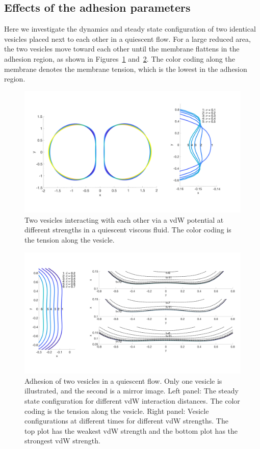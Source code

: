 \documentclass[%
preprint,
 amsmath,amssymb,
 aps,
]{revtex4-1}
\begin{document}
\subsection{Effects of the adhesion parameters}
\label{subsec:qflow_adhesion_parameters} 
Here we investigate the dynamics and steady state configuration of two
identical vesicles placed next to each other in a quiescent flow.  For a
large reduced area, the two vesicles move toward each other until the
membrane flattens in the adhesion region, as shown in
Figures~\ref{fig:qflow01} and~\ref{fig:qflow02}.  The color coding along
the membrane denotes the membrane tension, which is the lowest in the
adhesion region.

\begin{figure}
\includegraphics[keepaspectratio=true,scale=0.125]{figs/Nrelax2Ves02-rA0p96adR0p4.png}
\caption{Two vesicles interacting with each other via a vdW potential at different strengths in a quiescent viscous fluid. The color coding is the tension along the vesicle.}
\label{fig:qflow01}
\end{figure}

\begin{figure}
\includegraphics[keepaspectratio=true,scale=0.25]{figs/Nrelax2Ves02composite-draining.pdf}
\caption{Adhesion of two vesicles in a quiescent flow.  Only one vesicle
  is illustrated, and the second is a mirror image.  Left panel: The
  steady state configuration for different vdW interaction distances.
  The color coding is the tension along the vesicle.  Right panel:
  Vesicle configurations at different times for different vdW strengths.
  The top plot has the weakest vdW strength and the bottom plot has the
  strongest vdW strength.}
\label{fig:qflow02} 
\end{figure}
\end{document}
